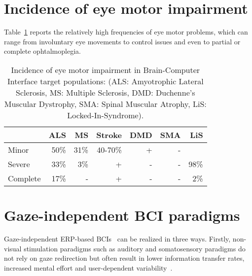 \section{Incidence of eye motor impairment}
Table~\ref{tab:incidence} reports the relatively high frequencies of
eye motor problems, which can range from involuntary eye movements to control
issues and even to partial or complete ophtalmoplegia.
\begin{table}
	\centering
	\begin{tabular}{@{}|l|rrrrr|r|@{}}
		\hline
		         & ALS  & MS   & Stroke  &
		DMD      & SMA  & LiS                           \\ \hline
		Minor    & 50\% & 31\% & 40-70\% & + & - &      \\
		Severe   & 33\% & 3\%  & +       & - & - & 98\% \\
		Complete & 17\% & -    & +       & - & - & 2\%  \\
		\hline
	\end{tabular}
	\caption{Incidence of eye motor impairment in Brain-Computer Interface target
		populations: (ALS: Amyotrophic Lateral Sclerosis, MS: Multiple Sclerosis,
		DMD: Duchenne's Muscular Dystrophy, SMA: Spinal Muscular Atrophy, LiS:
		Locked-In-Syndrome).}\label{tab:incidence}
\end{table}


\section{Gaze-independent BCI paradigms}
\label{sec:gaze-independence-paradigms}
Gaze-independent ERP-based BCIs~\cite{Riccio2012, Aloise2012} can be realized in three
ways. Firstly, non-visual stimulation paradigms such as auditory and somatosensory paradigms
do not rely on gaze redirection but often result in lower information transfer
rates, increased mental effort and user-dependent variability~\cite{Reichert2020b}.


